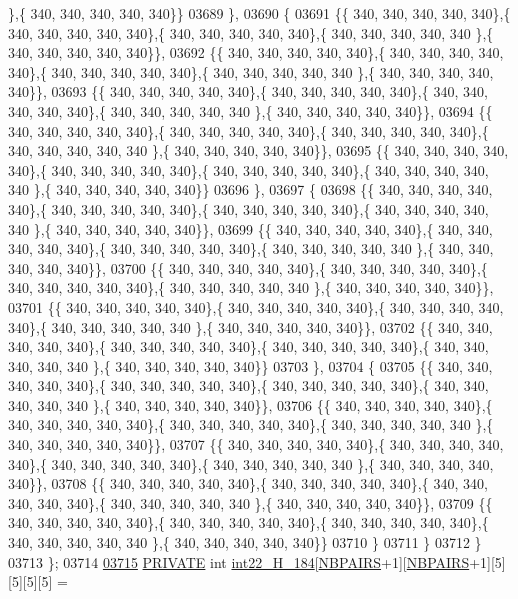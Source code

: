 \begin{DoxyCode}
      \},\{ 340, 340, 340, 340, 340\}\}
03689 \},
03690 \{
03691 \{\{ 340, 340, 340, 340, 340\},\{ 340, 340, 340, 340, 340\},\{ 340, 340, 340, 340, 340\},\{ 340, 340, 340, 340, 340
      \},\{ 340, 340, 340, 340, 340\}\},
03692 \{\{ 340, 340, 340, 340, 340\},\{ 340, 340, 340, 340, 340\},\{ 340, 340, 340, 340, 340\},\{ 340, 340, 340, 340, 340
      \},\{ 340, 340, 340, 340, 340\}\},
03693 \{\{ 340, 340, 340, 340, 340\},\{ 340, 340, 340, 340, 340\},\{ 340, 340, 340, 340, 340\},\{ 340, 340, 340, 340, 340
      \},\{ 340, 340, 340, 340, 340\}\},
03694 \{\{ 340, 340, 340, 340, 340\},\{ 340, 340, 340, 340, 340\},\{ 340, 340, 340, 340, 340\},\{ 340, 340, 340, 340, 340
      \},\{ 340, 340, 340, 340, 340\}\},
03695 \{\{ 340, 340, 340, 340, 340\},\{ 340, 340, 340, 340, 340\},\{ 340, 340, 340, 340, 340\},\{ 340, 340, 340, 340, 340
      \},\{ 340, 340, 340, 340, 340\}\}
03696 \},
03697 \{
03698 \{\{ 340, 340, 340, 340, 340\},\{ 340, 340, 340, 340, 340\},\{ 340, 340, 340, 340, 340\},\{ 340, 340, 340, 340, 340
      \},\{ 340, 340, 340, 340, 340\}\},
03699 \{\{ 340, 340, 340, 340, 340\},\{ 340, 340, 340, 340, 340\},\{ 340, 340, 340, 340, 340\},\{ 340, 340, 340, 340, 340
      \},\{ 340, 340, 340, 340, 340\}\},
03700 \{\{ 340, 340, 340, 340, 340\},\{ 340, 340, 340, 340, 340\},\{ 340, 340, 340, 340, 340\},\{ 340, 340, 340, 340, 340
      \},\{ 340, 340, 340, 340, 340\}\},
03701 \{\{ 340, 340, 340, 340, 340\},\{ 340, 340, 340, 340, 340\},\{ 340, 340, 340, 340, 340\},\{ 340, 340, 340, 340, 340
      \},\{ 340, 340, 340, 340, 340\}\},
03702 \{\{ 340, 340, 340, 340, 340\},\{ 340, 340, 340, 340, 340\},\{ 340, 340, 340, 340, 340\},\{ 340, 340, 340, 340, 340
      \},\{ 340, 340, 340, 340, 340\}\}
03703 \},
03704 \{
03705 \{\{ 340, 340, 340, 340, 340\},\{ 340, 340, 340, 340, 340\},\{ 340, 340, 340, 340, 340\},\{ 340, 340, 340, 340, 340
      \},\{ 340, 340, 340, 340, 340\}\},
03706 \{\{ 340, 340, 340, 340, 340\},\{ 340, 340, 340, 340, 340\},\{ 340, 340, 340, 340, 340\},\{ 340, 340, 340, 340, 340
      \},\{ 340, 340, 340, 340, 340\}\},
03707 \{\{ 340, 340, 340, 340, 340\},\{ 340, 340, 340, 340, 340\},\{ 340, 340, 340, 340, 340\},\{ 340, 340, 340, 340, 340
      \},\{ 340, 340, 340, 340, 340\}\},
03708 \{\{ 340, 340, 340, 340, 340\},\{ 340, 340, 340, 340, 340\},\{ 340, 340, 340, 340, 340\},\{ 340, 340, 340, 340, 340
      \},\{ 340, 340, 340, 340, 340\}\},
03709 \{\{ 340, 340, 340, 340, 340\},\{ 340, 340, 340, 340, 340\},\{ 340, 340, 340, 340, 340\},\{ 340, 340, 340, 340, 340
      \},\{ 340, 340, 340, 340, 340\}\}
03710 \}
03711 \}
03712 \}
03713 \};
03714 
\mbox{\hyperlink{1_88_84__intloops_8h_a9c7d268889f27a53d324379003d78198}{03715}} \mbox{\hyperlink{edit__cost_8h_a5e151c615eda34903514212f05a5ccf8}{PRIVATE}} \textcolor{keywordtype}{int} \mbox{\hyperlink{1_88_84__intloops_8h_a9c7d268889f27a53d324379003d78198}{int22\_H\_184}}[\mbox{\hyperlink{1_88_84__epars_8h_a5e75221c779d618eab81e096f37e32ce}{NBPAIRS}}+1][\mbox{\hyperlink{1_88_84__epars_8h_a5e75221c779d618eab81e096f37e32ce}{NBPAIRS}}+1][5][5][5][5] =

\end{DoxyCode}
